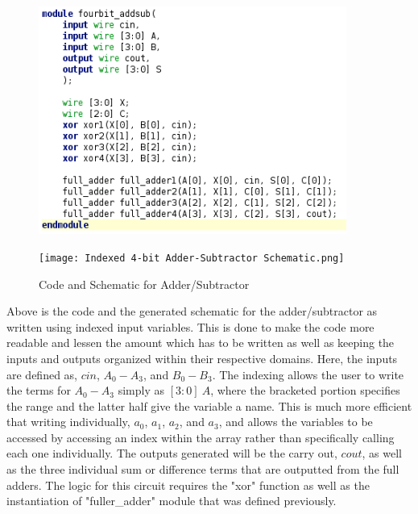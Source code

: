 \documentclass[12pt]{article}
\begin{document}
    \begin{figure}[h]
        \begin{minipage}{.5\textwidth}
            \centering
            \includegraphics[width=0.9\textwidth]{Indexed AddSub Code.png}
        \end{minipage}
        \begin{minipage}{.55\textwidth}
            \centering
            \texttt{[image: Indexed 4-bit Adder-Subtractor
            Schematic.png]}
        \end{minipage}
        \caption{Code and Schematic for Adder/Subtractor}
    \end{figure}
    \newpage
    \par Above is the code and the generated schematic for the adder/subtractor
    as written using indexed input variables. This is done to make the code more
    readable and lessen the amount which has to be written as well as keeping
    the inputs and outputs organized within their respective domains. Here, the
    inputs are defined as, $cin$, $A_0-A_3$, and $B_0-B_3$. The indexing allows
    the user to write the terms for $A_0-A_3$ simply as $[3:0]\ A$, where the
    bracketed portion specifies the range and the latter half give the variable
    a name. This is much more efficient that writing individually, $a_0$, $a_1$,
    $a_2$, and $a_3$, and allows the variables to be accessed by accessing an
    index within the array rather than specifically calling each one
    individually. The outputs generated will be the carry out, $cout$, as well
    as the three individual sum or difference terms that are outputted from the
    full adders. The logic for this circuit requires the "xor" function as well
    as the instantiation of "fuller\_adder" module that was defined previously.
\end{document}
